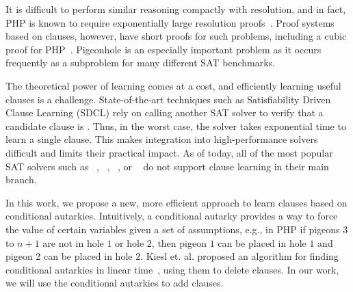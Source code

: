 It is difficult to perform similar reasoning compactly with resolution, and in
fact, PHP is known to require exponentially large resolution
proofs~\cite{hakenpigeonhole,mutilatedchessboard-exponential}. Proof systems
based on \pr clauses, however, have short proofs for such problems, including a
cubic proof for PHP~\cite{prclauses}. Pigeonhole is an especially important
problem as it occurs frequently as a subproblem for many different SAT
benchmarks.

The theoretical power of \pr learning comes at a cost, and efficiently learning
useful \pr clauses is a challenge. State-of-the-art techniques such as
Satisfiability Driven Clause Learning (SDCL) rely on calling another SAT solver
to verify that a candidate clause is \pr \cite{sadical}. 
Thus, in the worst case, the solver takes exponential time to learn a single \pr
clause. This makes integration into high-performance solvers difficult and
limits their practical impact. As of today, all of the most popular SAT solvers
such as \cadical~\cite{cadical}, \kissat~\cite{kissat},
\cryptoMiniSAT~\cite{cryptominisat}, or \lingeling~\cite{lingeling} do not
support \pr clause learning in their main branch.

In this work, we propose a new, more efficient approach to learn \pr clauses
based on conditional autarkies. Intuitively, a conditional autarky provides a
way to force the value of certain variables given a set of assumptions, e.g., in
PHP if pigeons $3 $ to $ n+1$ are not in hole $1$ or hole $2$, then pigeon $1$
can be placed in hole $1$ and pigeon $2$ can be placed in hole $2$. Kiesl et.
al. proposed an algorithm for finding conditional autarkies in linear
time~\cite{conditionalautarkies}, using them to delete clauses. In our work, we
will use the conditional autarkies to add \pr clauses. 
%

